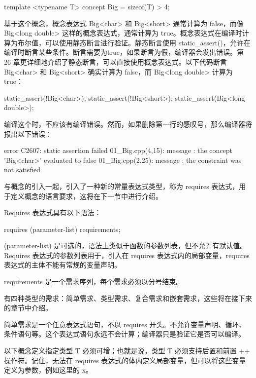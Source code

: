 \begin{cpp}
template <typename T>
concept Big = sizeof(T) > 4;
\end{cpp}

基于这个概念，概念表达式 Big<char> 和 Big<short> 通常计算为 false，而像 Big<long double> 这样的概念表达式，通常计算为 true。概念表达式在编译时计算为布尔值，可以使用静态断言进行验证。静态断言使用 static\_assert()，允许在编译时断言某些条件。断言需要为true，如果断言为假，编译器会发出错误。第 26 章更详细地介绍了静态断言，可以直接使用概念表达式。以下代码断言 Big<char> 和 Big<short> 确实计算为 false，而 Big<long double> 计算为 true：

\begin{cpp}
static_assert(!Big<char>);
static_assert(!Big<short>);
static_assert(Big<long double>);
\end{cpp}

编译这个时，不应该有编译错误。然而，如果删除第一行的感叹号，那么编译器将报出以下错误：

\begin{shell}
error C2607: static assertion failed
01_Big.cpp(4,15): message : the concept 'Big<char>' evaluated to false
01_Big.cpp(2,25): message : the constraint was not satisfied
\end{shell}

与概念的引入一起，引入了一种新的常量表达式类型，称为 requires 表达式，用于定义概念的语言要求，这将在下一节中进行介绍。


Requires 表达式具有以下语法：

\begin{cpp}
requires (parameter-list) { requirements; }
\end{cpp}

(parameter-list) 是可选的，语法上类似于函数的参数列表，但不允许有默认值。Requires 表达式的参数列表用于，引入在 requires 表达式内的局部变量，requires 表达式的主体不能有常规的变量声明。

requirements 是一个需求序列，每个需求必须以分号结束。

有四种类型的需求：简单需求、类型需求、复合需求和嵌套需求，这些将在接下来的章节中介绍。


简单需求是一个任意表达式语句，不以 requires 开头。不允许变量声明、循环、条件语句等。这个表达式语句永远不会计算；编译器只是验证它是否可以编译。

以下概念定义指定类型 T 必须可增；也就是说，类型 T 必须支持后置和前置 ++ 操作符。记住，无法在 requires 表达式的体内定义局部变量，但可以将这些变量定义为参数，例如这里的 x。

